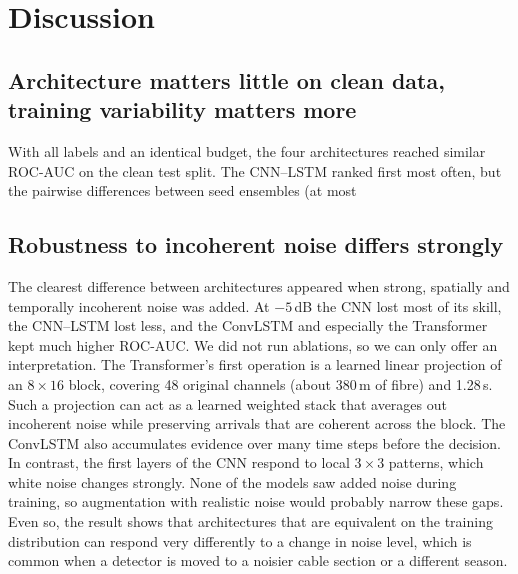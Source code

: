 \section*{Discussion}
\subsection*{Architecture matters little on clean data, training variability matters more}
With all labels and an identical budget, the four architectures reached similar ROC-AUC on the clean test split. The CNN--LSTM ranked first most often, but the pairwise differences between seed ensembles (at most %

\subsection*{Robustness to incoherent noise differs strongly}
The clearest difference between architectures appeared when strong, spatially and temporally incoherent noise was added. At $-5$\,dB the CNN lost most of its skill, the CNN--LSTM lost less, and the ConvLSTM and especially the Transformer kept much higher ROC-AUC. We did not run ablations, so we can only offer an interpretation. The Transformer's first operation is a learned linear projection of an $8\times16$ block, covering 48 original channels (about 380\,m of fibre) and 1.28\,s. Such a projection can act as a learned weighted stack that averages out incoherent noise while preserving arrivals that are coherent across the block. The ConvLSTM also accumulates evidence over many time steps before the decision. In contrast, the first layers of the CNN respond to local $3\times3$ patterns, which white noise changes strongly. None of the models saw added noise during training, so augmentation with realistic noise would probably narrow these gaps. Even so, the result shows that architectures that are equivalent on the training distribution can respond very differently to a change in noise level, which is common when a detector is moved to a noisier cable section or a different season.

